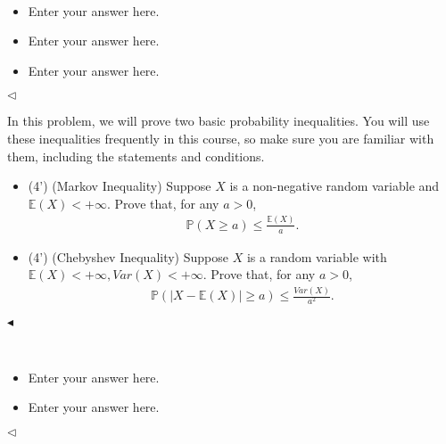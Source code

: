 \documentclass[11pt]{article}
\newenvironment{problem}[2][Problem]{\begin{trivlist}
\item[\hskip \labelsep {\bfseries #1}\hskip \labelsep {\bfseries #2.}]}{\hfill$\blacktriangleleft$\end{trivlist}}
\newenvironment{answer}[1][Answer]{\begin{trivlist}
\item[\hskip \labelsep {\bfseries #1.}\hskip \labelsep]}{\hfill$\lhd$\end{trivlist}}
\begin{document}
\begin{answer} ~
\begin{itemize}
    \item [(1)] Enter your answer here.
    \item [(2)] Enter your answer here.
    \item [(3)] Enter your answer here. 
\end{itemize}
\end{answer}



\begin{problem}{3 (8')} In this problem, we will prove two basic probability inequalities. You will use these inequalities frequently in this course, so make sure you are familiar with them, including the statements and conditions.
\begin{itemize}
    \item [(1)] (4') (Markov Inequality) Suppose $X$ is a non-negative random variable and $\mathbb{E}(X)<+\infty$. Prove that, for any $a>0$,
    \begin{align*}
        \mathbb{P}(X\geq a)\leq\frac{\mathbb{E}(X)}{a}.
    \end{align*}
    \item [(2)] (4') (Chebyshev Inequality) Suppose $X$ is a random variable with $\mathbb{E}(X)<+\infty, Var(X)<+\infty$. Prove that, for any $a>0$,
    \begin{align*}
        \mathbb{P}(|X-\mathbb{E}(X)|\geq a)\leq\frac{Var(X)}{a^2}.
    \end{align*}
\end{itemize}
\end{problem}

\begin{answer} ~
\begin{itemize}
    \item [(1)] Enter your answer here.
    \item [(2)] Enter your answer here.
\end{itemize}
\end{answer}
\end{document}
